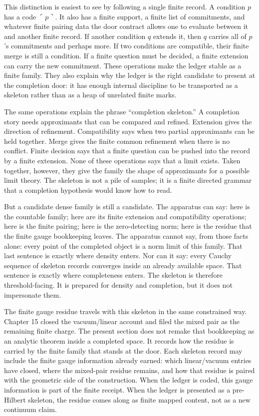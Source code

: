 This distinction is easiest to see by following a single finite record. A
condition \(p\) has a code \(\ulcorner p\urcorner\). It also has a finite
support, a finite list of commitments, and whatever finite pairing data the
door contract allows one to evaluate between it and another finite record. If
another condition \(q\) extends it, then \(q\) carries all of \(p\)'s
commitments and perhaps more. If two conditions are compatible, their finite
merge is still a condition. If a finite question must be decided, a finite
extension can carry the new commitment. These operations make the ledger
stable as a finite family. They also explain why the ledger is the right
candidate to present at the completion door: it has enough internal discipline
to be transported as a skeleton rather than as a heap of unrelated finite
marks.

The same operations explain the phrase ``completion skeleton.'' A completion
story needs approximants that can be compared and refined. Extension gives the
direction of refinement. Compatibility says when two partial approximants can
be held together. Merge gives the finite common refinement when there is no
conflict. Finite decision says that a finite question can be pushed into the
record by a finite extension. None of these operations says that a limit
exists. Taken together, however, they give the family the shape of approximants
for a possible limit theory. The skeleton is not a pile of samples; it is a
finite directed grammar that a completion hypothesis would know how to read.

But a candidate dense family is still a candidate. The apparatus can say:
here is the countable family; here are its finite extension and compatibility
operations; here is the finite pairing; here is the zero-detecting norm; here
is the residue that the finite gauge bookkeeping leaves. The apparatus cannot
say, from those facts alone: every point of the completed object is a norm
limit of this family. That last sentence is exactly where density enters. Nor
can it say: every Cauchy sequence of skeleton records converges inside an
already available space. That sentence is exactly where completeness enters.
The skeleton is therefore threshold-facing. It is prepared for density and
completion, but it does not impersonate them.

The finite gauge residue travels with this skeleton in the same constrained
way. Chapter 15 closed the vacuum/linear account and filed the mixed pair as
the remaining finite charge. The present section does not remake that
bookkeeping as an analytic theorem inside a completed space. It records how the
residue is carried by the finite family that stands at the door. Each skeleton
record may include the finite gauge information already earned: which
linear/vacuum entries have closed, where the mixed-pair residue remains, and
how that residue is paired with the geometric side of the construction. When
the ledger is coded, this gauge information is part of the finite receipt. When
the ledger is presented as a pre-Hilbert skeleton, the residue comes along as
finite mapped content, not as a new continuum claim.

